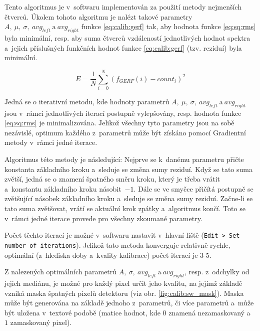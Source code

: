 Tento algoritmus je v~softwaru implementován za použití metody nejmenších čtverců. Úkolem tohoto algoritmu je nalézt takové parametry $A,~\mu,~\sigma,~avg_{left}~\text{a}~avg_{right}$ funkce \ref{eq:calib:gerf} tak, aby hodnota funkce \ref{eq:sq:rms} byla minimální, resp. aby suma čtverců vzdáleností jednotlivých hodnot spektra a~jejich příslušných funkčních hodnot funkce \ref{eq:calib:gerf} (tzv. reziduí) byla minimální.

\begin{equation}\label{eq:sq:rms}
	E = \frac{1}{N} \sum_{i=0}^{N}(f_{GERF}(i) - count_i)^2
\end{equation}

Jedná se o iterativní metodu, kde hodnoty parametrů $A,~\mu,~\sigma,~avg_{left}~\text{a}~avg_{right}$ jsou v~rámci jednotlivých iterací postupně vylepšovány, resp. hodnota funkce \ref{eq:sq:rms} je minimalizována. Jelikož všechny tyto parametry jsou na sobě nezávislé, optimum každého z~parametrů může být získáno pomocí Gradientní metody v~rámci jedné iterace.

Algoritmus této metody je následující: Nejprve se k~danému parametru přičte konstanta základního kroku a~sleduje se změna sumy reziduí. Když se tato suma zvětší, jedná se o znamení špatného směru kroku, který je třeba vrátit a~konstantu základního kroku násobit~$-1$. Dále se ve smyčce přičítá postupně se zvětšující násobek základního kroku a~sleduje se změna sumy reziduí. Začne-li se tato suma zvětšovat, vrátí se aktuální krok zpátky a~algoritmus končí. Toto se v~rámci jedné iterace provede pro všechny zkoumané parametry.

Počet těchto iterací je možné v~softwaru nastavit v~hlavní liště (\texttt{Edit > Set number of iterations}). Jelikož tato metoda konverguje relativně rychle, optimální (z~hlediska doby a~kvality kalibrace) počet iterací je 3-5.

Z nalezených optimálních parametrů $A,~\sigma,~avg_{left}~\text{a}~avg_{right}$, resp. z~odchylky od jejich mediánu, je možné pro každý pixel určit jeho kvalitu, na jejímž základě vzniká maska špatných pixelů detektoru (viz obr. \ref{fig:calib:sw_mask}). Maska může být generována na základě jednoho z~parametrů, či více parametrů a~může být uložena v~textové podobě (matice hodnot, kde $0$ znamená nezamaskovaný a~$1$ zamaskovaný pixel).

